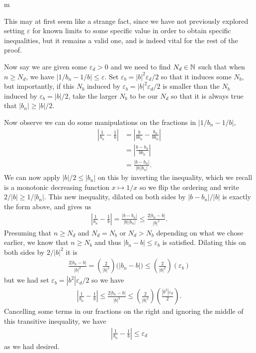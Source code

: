 \documentclass[11pt]{article}
\begin{document}
\begin{my proof}{m}
\begin{enumerate}
This may at first seem like a strange fact, since we have not previously explored setting $\varepsilon$ for known limits to some specific value in order to obtain specific inequalities, but it remains a valid one, and is indeed vital for the rest of the proof.

Now say we are given some $\varepsilon_d > 0$ and we need to find $N_d \in \mathbb{N}$ such that when $n \ge N_d$, we have $|1/b_n - 1/b| \le \varepsilon$. Set $\varepsilon_b = |b|^2 \varepsilon_d / 2$ so that it induces some $N_b$, but importantly, if this $N_b$ induced by $\varepsilon_b = |b|^2 \varepsilon_d / 2$ is smaller than the $N_b$ induced by $\varepsilon_b = |b|/2$, take the larger $N_b$ to be our $N_d$ so that it is always true that $|b_n| \ge |b|/2$.

Now observe we can do some manipulations on the fractions in $|1/b_n - 1/b|$, \begin{align*}
\left|\frac{1}{b_n} - \frac{1}{b} \right| &= \left|\frac{b}{ b b_n} - \frac{b_n}{b b_n} \right| \\
&= \left|\frac{b - b_n}{ b b_n} \right| \\
&= \frac{|b - b_n|}{ |b| |b_n|}.
\end{align*}
We can now apply $|b|/2 \le |b_n|$ on this by inverting the inequality, which we recall is a monotonic decreasing function $x \mapsto 1/x$ so we flip the ordering and write $2/|b| \ge 1/|b_n|$. This new inequality, dilated on both sides by $|b-b_n|/|b|$ is exactly the form above, and gives us \begin{gather*}
\left|\frac{1}{b_n} - \frac{1}{b} \right| = \frac{|b - b_n|}{ |b| |b_n|} \le \frac{2|b_n - b|}{|b|^2}.
\end{gather*}
Presuming that $n \ge N_d$ and $N_d = N_b$ or $N_d > N_b$ depending on what we chose earlier, we know that $n \ge N_b$ and thus $|b_n - b| \le \varepsilon_b$ is satisfied. Dilating this on both sides by $2/|b|^2$ it is \begin{gather*}
\frac{2|b_n - b|}{|b|^2} = \left( \frac{2}{|b|^2} \right) \big( |b_n - b| \big) \le \left( \frac{2 }{|b|^2} \right) ( \varepsilon_b ) 
\end{gather*}
but we had set $\varepsilon_b = |b^2| \varepsilon_d / 2$ so we have \begin{gather*}
\left|\frac{1}{b_n} - \frac{1}{b} \right| \le \frac{2|b_n - b|}{|b|^2} \le \left( \frac{2 }{|b|^2} \right) \left( \frac{|b^2| \varepsilon_d}{2}\right).
\end{gather*}
Cancelling some terms in our fractions on the right and ignoring the middle of this transitive inequality, we have \begin{gather*}
\left|\frac{1}{b_n} - \frac{1}{b} \right| \le \varepsilon_d
\end{gather*}
as we had desired.
\end{enumerate}
\end{my proof}
\end{document}
